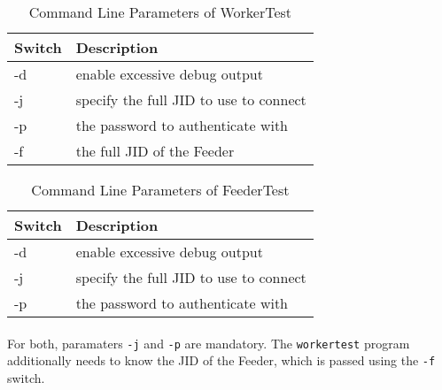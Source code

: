 \begin{table}[H]
\begin{tabularx}{\linewidth}{ll}
\toprule
\textbf{Switch} & \textbf{Description} \\
\midrule
\endhead
-d & enable excessive debug output \\
-j & specify the full JID to use to connect \\
-p & the password to authenticate with \\
-f & the full JID of the Feeder \\
\bottomrule
\end{tabularx}
\caption{Command Line Parameters of WorkerTest}
\label{tab:cmdlineworker}
\end{table}

\begin{table}[H]
\begin{tabularx}{\linewidth}{ll}
\toprule
\textbf{Switch} & \textbf{Description} \\
\midrule
\endhead
-d & enable excessive debug output \\
-j & specify the full JID to use to connect \\
-p & the password to authenticate with \\
\bottomrule
\end{tabularx}
\caption{Command Line Parameters of FeederTest}
\label{tab:cmdlinefeeder}
\end{table}

\paragraph{}
For both, paramaters \texttt{-j} and \texttt{-p} are mandatory. The \texttt{workertest} program additionally needs to know the JID of the Feeder, which is passed using the \texttt{-f} switch.
